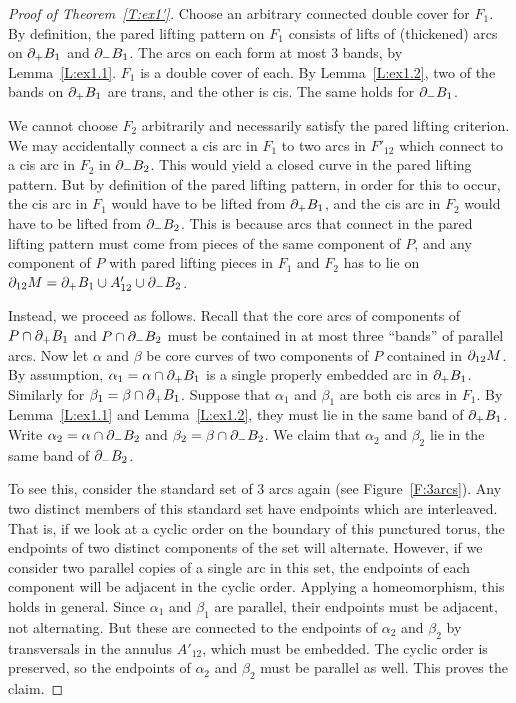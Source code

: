 \begin{proof}[Proof of Theorem~\ref{T:ex1'}]
Choose an arbitrary connected double cover for $F_1$. By definition, the pared
lifting pattern on $F_1$ consists of lifts of (thickened) arcs on $\partial_+ B_1$
and $\partial_- B_1$. The arcs on each form at most 3 bands, by Lemma~\ref{L:ex1.1}.
$F_1$ is a double cover of each.  By Lemma~\ref{L:ex1.2}, two of the bands on
$\partial_+B_1$ are trans, and the other is cis. The same holds for $\partial_-B_1$.

We cannot choose $F_2$ arbitrarily and necessarily satisfy the pared lifting
criterion. We may accidentally connect a cis arc in $F_1$ to two arcs in
$F'_{12}$ which connect to a cis arc in $F_2$ in $\partial_-B_2$. This would yield
a closed curve in the pared lifting pattern. But by definition of the pared
lifting pattern, in order for this to occur, the cis arc in $F_1$ would have to
be lifted from $\partial_+ B_1$, and the cis arc in $F_2$ would have to be lifted
from $\partial_- B_2$. This is because arcs that connect in the pared lifting
pattern must come from pieces of the same component of $P$, and any component
of $P$ with pared lifting pieces in $F_1$ and $F_2$ has to lie on $\partial_{12}
M = \partial_+ B_1 \cup A'_{12} \cup \partial_- B_2$.

Instead, we proceed as follows. Recall that the core arcs of components of $P
\cap \partial_+B_1$ and $P\cap \partial_- B_2$ must be contained in at most three
``bands'' of parallel arcs. Now let $\alpha$ and $\beta$ be core curves of two
components of $P$ contained in $\partial_{12}M$. By assumption, $\alpha_1 = \alpha
\cap \partial_+B_1$ is a single properly embedded arc in $\partial_+B_1$.  Similarly for
$\beta_1 = \beta \cap \partial_+B_1$.  Suppose that $\alpha_1$ and $\beta_1$ are
both cis arcs in $F_1$.  By Lemma~\ref{L:ex1.1} and Lemma~\ref{L:ex1.2}, they
must lie in the same band of $\partial_+B_1$.  Write $\alpha_2 = \alpha \cap
\partial_-B_2$ and $\beta_2 = \beta \cap \partial_-B_2$. We claim that $\alpha_2$ and
$\beta_2$ lie in the same band of $\partial_-B_2$.

To see this, consider the standard set of 3 arcs again (see
Figure~\ref{F:3arcs}). Any two distinct members of this standard set have
endpoints which are interleaved. That is, if we look at a cyclic order on the
boundary of this punctured torus, the endpoints of two distinct components of
the set will alternate. However, if we consider two parallel copies of a single
arc in this set, the endpoints of each component will be adjacent in the cyclic
order. Applying a homeomorphism, this holds in general. Since $\alpha_1$ and
$\beta_1$ are parallel, their endpoints must be adjacent, not alternating. But
these are connected to the endpoints of $\alpha_2$ and $\beta_2$ by
transversals in the annulus $A'_{12}$, which must be embedded. The cyclic order
is preserved, so the endpoints of $\alpha_2$ and $\beta_2$ must be parallel as
well. This proves the claim.


\end{proof}
